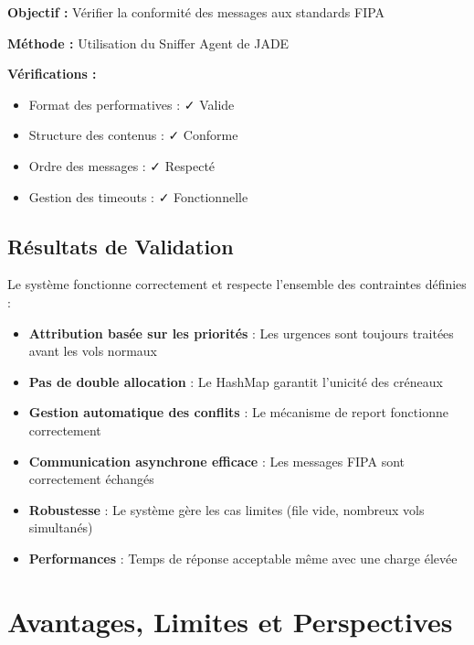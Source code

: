 \documentclass[12pt,a4paper]{article}
\begin{document}
\textbf{Objectif :} Vérifier la conformité des messages aux standards FIPA

\textbf{Méthode :} Utilisation du Sniffer Agent de JADE

\textbf{Vérifications :}
\begin{itemize}
    \item Format des performatives : ✓ Valide
    \item Structure des contenus : ✓ Conforme
    \item Ordre des messages : ✓ Respecté
    \item Gestion des timeouts : ✓ Fonctionnelle
\end{itemize}

\subsection{Résultats de Validation}

\begin{tcolorbox}[colback=green!10, colframe=green!60!black, title=\textbf{Validation Globale du Système}]
Le système fonctionne correctement et respecte l'ensemble des contraintes définies :

\begin{itemize}[leftmargin=*]
    \item[$\checkmark$] \textbf{Attribution basée sur les priorités} : Les urgences sont toujours traitées avant les vols normaux

    \item[$\checkmark$] \textbf{Pas de double allocation} : Le HashMap garantit l'unicité des créneaux

    \item[$\checkmark$] \textbf{Gestion automatique des conflits} : Le mécanisme de report fonctionne correctement

    \item[$\checkmark$] \textbf{Communication asynchrone efficace} : Les messages FIPA sont correctement échangés

    \item[$\checkmark$] \textbf{Robustesse} : Le système gère les cas limites (file vide, nombreux vols simultanés)

    \item[$\checkmark$] \textbf{Performances} : Temps de réponse acceptable même avec une charge élevée
\end{itemize}
\end{tcolorbox}

\section{Avantages, Limites et Perspectives}
\end{document}

